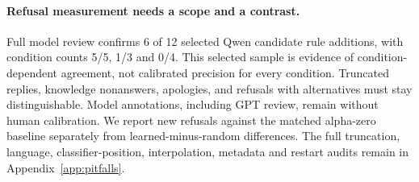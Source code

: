 \paragraph{Refusal measurement needs a scope and a contrast.} Full model review confirms 6 of 12 selected Qwen candidate rule additions, with condition counts 5/5, 1/3 and 0/4. This selected sample is evidence of condition-dependent agreement, not calibrated precision for every condition. Truncated replies, knowledge nonanswers, apologies, and refusals with alternatives must stay distinguishable. Model annotations, including GPT review, remain without human calibration. We report new refusals against the matched alpha-zero baseline separately from learned-minus-random differences. The full truncation, language, classifier-position, interpolation, metadata and restart audits remain in Appendix~\ref{app:pitfalls}.
